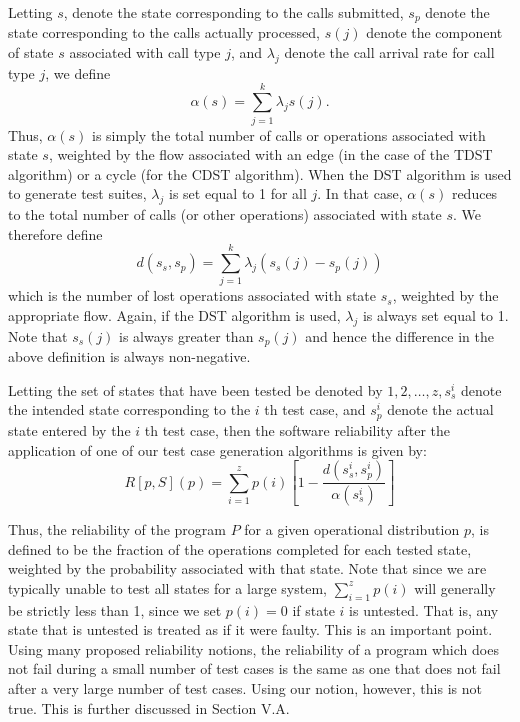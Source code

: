 \documentclass[journal, twoside]{IEEEtran}
\begin{document}
Letting $s$, denote the state corresponding to the calls submitted, $s_p$ denote the state corresponding to the calls actually
processed, $s(j)$ denote the component of state $s$ associated with
call type $j$, and $\lambda_j$ denote the call arrival rate for call type $j$, we
define 
\begin{equation}
    \alpha(s)= \sum_{j=1}^{k} \lambda_j s(j).
\end{equation}
Thus, $\alpha(s)$  is simply the total number of calls or operations
associated with state $s$, weighted by the flow associated with
an edge (in the case of the TDST algorithm) or a cycle (for the
CDST algorithm). When the DST algorithm is used to generate test suites, $\lambda_j$ is set equal to 1 for all $j$. In that case, $\alpha(s)$
reduces to the total number of calls (or other operations) associated with state $s$. We therefore define  
\begin{equation}
    d(s_s,s_p)=\sum_{j=1}^{k} \lambda_j(s_s(j) - s_p(j) )
\end{equation}
which is the number of lost operations associated with state $s_s$,
weighted by the appropriate flow. Again, if the DST algorithm
is used, $\lambda_j$ is always set equal to 1. Note that $s_s(j)$ is always
greater than $s_p(j)$ and hence the difference in the above definition is always non-negative. 

Letting the set of states that have been tested be denoted by $1,2,\ldots , z ,s_s^i$ denote the intended state corresponding to the $i$ th test case, and $s_p^i$
 denote the actual state entered by the $i$ th
test case, then the software reliability after the application of
one of our test case generation algorithms is given by: \begin{equation}
    R[p,S](p) = \sum_{i=1}^{z} p(i) 
    \left [ 1- \frac{d(s_s^i,s_p^i)}{\alpha(s_s^i)} \right ]
\end{equation}

Thus, the reliability of the program $P$ for a given operational distribution $p$, is defined to be the fraction of the operations completed for each tested state, weighted by the probability associated with that state. Note that since we are typically unable to test all states for a large system,
$\sum_{i=1}^{z} p(i)$
will generally be strictly less than 1, since we set $p(i)=0$  if state $i$ is untested. That is, any state that is untested is treated as if it were faulty. This is an important point. Using many proposed
reliability notions, the reliability of a program which does not
fail during a small number of test cases is the same as one that
does not fail after a very large number of test cases. Using our
notion, however, this is not true. This is further discussed in
Section V.A. 
\end{document}
